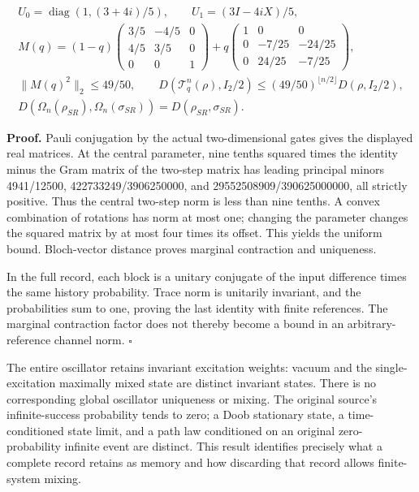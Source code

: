 \documentclass[
  11pt,
  oneside]{book}
\begin{document}
\[
\begin{gathered}
U_0=\operatorname{diag}(1,(3+4i)/5),\qquad U_1=(3I-4iX)/5,\\
M(q)=(1-q)
\begin{pmatrix}3/5&-4/5&0\\4/5&3/5&0\\0&0&1\end{pmatrix}
+q\begin{pmatrix}1&0&0\\0&-7/25&-24/25\\0&24/25&-7/25\end{pmatrix},\\
\|M(q)^2\|_2\le49/50,\qquad
D(\mathcal T_q^n(\rho),I_2/2)
\le(49/50)^{\lfloor n/2\rfloor}D(\rho,I_2/2),\\
D(\Omega_n(\rho_{SR}),\Omega_n(\sigma_{SR}))
=D(\rho_{SR},\sigma_{SR}).
\end{gathered}
\]

\textbf{Proof.} Pauli conjugation by the actual two-dimensional gates
gives the displayed real matrices. At the central parameter, nine tenths
squared times the identity minus the Gram matrix of the two-step matrix
has leading principal minors 4941/12500, 422733249/3906250000, and
29552508909/390625000000, all strictly positive. Thus the central
two-step norm is less than nine tenths. A convex combination of
rotations has norm at most one; changing the parameter changes the
squared matrix by at most four times its offset. This yields the uniform
bound. Bloch-vector distance proves marginal contraction and uniqueness.

In the full record, each block is a unitary conjugate of the input
difference times the same history probability. Trace norm is unitarily
invariant, and the probabilities sum to one, proving the last identity
with finite references. The marginal contraction factor does not thereby
become a bound in an arbitrary-reference channel norm. \(\square\)

The entire oscillator retains invariant excitation weights: vacuum and
the single-excitation maximally mixed state are distinct invariant
states. There is no corresponding global oscillator uniqueness or
mixing. The original source's infinite-success probability tends to
zero; a Doob stationary state, a time-conditioned state limit, and a
path law conditioned on an original zero-probability infinite event are
distinct. This result identifies precisely what a complete record
retains as memory and how discarding that record allows finite-system
mixing.
\end{document}

